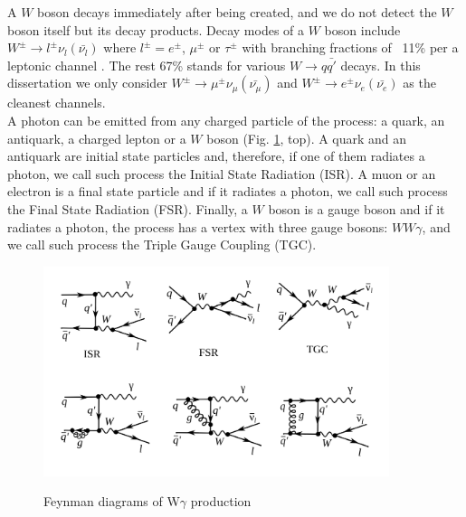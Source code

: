 A $W$ boson decays immediately after being created, and we do not detect the $W$ boson itself but its decay products. Decay modes of a $W$ boson include $W^\pm \rightarrow l^\pm \nu_l ({\bar{\nu_l}})$ where $l^\pm=e^\pm$, $\mu^\pm$ or $\tau^\pm$ with branching fractions of ~11\% per a leptonic channel \cite{ref_PDG}. The rest 67\% stands for various $W\rightarrow q\bar{q'}$ decays. In this dissertation we only consider $W^\pm \rightarrow \mu^\pm \nu_\mu ({\bar{\nu_\mu}})$ and $W^\pm \rightarrow e^\pm \nu_e ({\bar{\nu_e}})$ as the cleanest channels.\\


A photon can be emitted from any charged particle of the process: a quark, an antiquark, a charged lepton or a $W$ boson (Fig. \ref{fig:feynmWg_LO_NLO}, top). A quark and an antiquark are initial state particles and, therefore, if one of them radiates a photon, we call such process the Initial State Radiation (ISR). A muon or an electron is a final state particle and if it radiates a photon, we call such process the Final State Radiation (FSR). Finally, a $W$ boson is a gauge boson and if it radiates a photon, the process has a vertex with three gauge bosons: $WW\gamma$, and we call such process the Triple Gauge Coupling (TGC).\\

\begin{figure}[htb]
  \begin{center}
    {\includegraphics[width=0.90\textwidth]{../figs/WgAbout/feynmWg_LO_NLO.png}}
    \caption{Feynman diagrams of W$\gamma$ production}
    \label{fig:feynmWg_LO_NLO}
  \end{center}
\end{figure}

